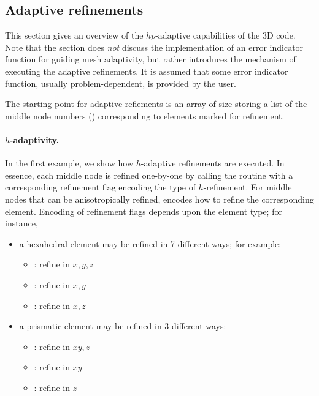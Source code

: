 \subsection{Adaptive refinements}
\label{sec:adaptive-refinements}

This section gives an overview of the $hp$-adaptive capabilities of the \hp3D code. Note that the section does \emph{not} discuss the implementation of an error indicator function for guiding mesh adaptivity, but rather introduces the mechanism of executing the adaptive refinements. It is assumed that some error indicator function, usually problem-dependent, is provided by the user. 

The starting point for adaptive refiements is an array  of size  storing a list of the middle node numbers () corresponding to elements marked for refinement.

\paragraph{$h$-adaptivity.}
In the first example, we show how $h$-adaptive refinements are executed. In essence, each middle node is refined one-by-one by calling the  routine with a corresponding refinement flag  encoding the type of $h$-refinement. For middle nodes that can be anisotropically refined,  encodes how to refine the corresponding element. Encoding of refinement flags depends upon the element type; for instance,
\begin{itemize}
	\item a hexahedral element may be refined in 7 different ways; for example:
	\begin{itemize}
		\itemsep 0pt
		\item {} : refine in $x,y,z$
		\item {} : refine in $x,y$
		\item {} : refine in $x,z$
	\end{itemize}
	\item a prismatic element may be refined in 3 different ways:
	\begin{itemize}
		\itemsep 0pt
		\item {} : refine in $xy,z$
		\item {} : refine in $xy$
		\item {} : refine in $z$
	\end{itemize}
\end{itemize}

